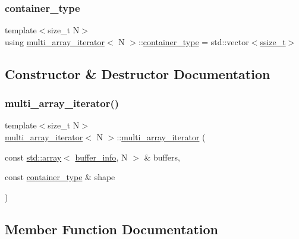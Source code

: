 \subsubsection{\texorpdfstring{container\_type}{container\_type}}
{\footnotesize\ttfamily template$<$size\+\_\+t N$>$ \\
using \mbox{\hyperlink{classmulti__array__iterator}{multi\+\_\+array\+\_\+iterator}}$<$ N $>$\+::\mbox{\hyperlink{classmulti__array__iterator_acae334d3b88a49fe7301a79d04a02563}{container\+\_\+type}} =  std\+::vector$<$\mbox{\hyperlink{detail_2common_8h_ac430d16fc097b3bf0a7469cfd09decda}{ssize\+\_\+t}}$>$}



\subsection{Constructor \& Destructor Documentation}
\mbox{\label{classmulti__array__iterator_a658a64d1b635a6e581fc606913490dec}} 
\subsubsection{\texorpdfstring{multi\_array\_iterator()}{multi\_array\_iterator()}}
{\footnotesize\ttfamily template$<$size\+\_\+t N$>$ \\
\mbox{\hyperlink{classmulti__array__iterator}{multi\+\_\+array\+\_\+iterator}}$<$ N $>$\+::\mbox{\hyperlink{classmulti__array__iterator}{multi\+\_\+array\+\_\+iterator}} (\begin{DoxyParamCaption}\item[{const \mbox{\hyperlink{_s_d_l__opengl__glext_8h_a52f38e7d822a46377fde7a02708eedb1}{std\+::array}}$<$ \mbox{\hyperlink{structbuffer__info}{buffer\+\_\+info}}, N $>$ \&}]{buffers,  }\item[{const \mbox{\hyperlink{classmulti__array__iterator_acae334d3b88a49fe7301a79d04a02563}{container\+\_\+type}} \&}]{shape }\end{DoxyParamCaption})\hspace{0.3cm}{\ttfamily [inline]}}



\subsection{Member Function Documentation}
\mbox{\label{classmulti__array__iterator_aae21619a2f9dc2b336a9228039294d83}} 

